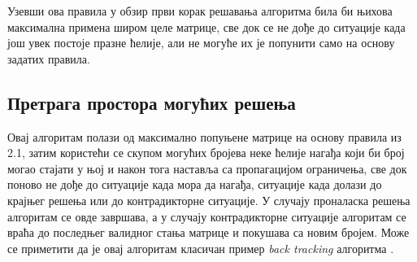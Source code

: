 Узевши ова правила у обзир први корак решавања алгоритма била би њихова максимална примена широм целе матрице, све док се не дође до ситуације када још увек постоје празне ћелије, али не могуће их је попунити само на основу задатих правила.

\subsection{Претрага простора могућих решења}

Овај алгоритам полази од максимално попуњене матрице на основу правила из 2.1, затим користећи се скупом могућих бројева неке ћелије нагађа који би број могао стајати у њој и након тога наставља са пропагацијом ограничења, све док поново не дође до ситуације када мора да нагађа, ситуације када долази до крајњег решења или до контрадикторне ситуације. У случају проналаска решења алгоритам се овде завршава, а у случају контрадикторне ситуације алгоритам се враћа до последњег валидног стања матрице и покушава са новим бројем. Може се приметити да је овај алгоритам класичан пример \textit{back tracking} алгоритма \cite{backtrack}.\\